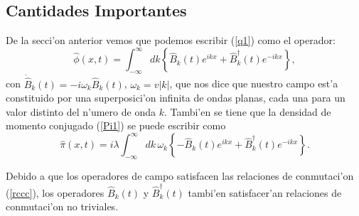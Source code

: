 \subsection{Cantidades Importantes}

De la secci'on anterior vemos que podemos escribir (\ref{q1}) como el operador:
\begin{equation}
\hat{\phi}(x,t) =\int_{-\infty}^\infty dk\left\{ \hat{B}_k(t)
e^{ikx}+\hat{B}_k^\dagger (t) e^{-ikx}\right\},
\label{qOperador1}
\end{equation}
con $\dot{\hat{B}}_k(t)=-i\omega_k\hat{B}_k(t)$, $\omega_k=v|k|$, que nos
dice que nuestro campo est'a constituido por una superposici'on
infinita de ondas planas, cada una para un valor distinto del n'umero de
onda $k$.
Tambi'en se tiene que la densidad de momento conjugado (\ref{Pi1}) se puede
escribir como
\begin{equation}
\hat{\pi}(x,t) =i\lambda\int_{-\infty}^\infty dk\,\omega_k\left\{
-\hat{B}_k(t) e^{ikx}+\hat{B}_k^\dagger (t)
e^{-ikx}\right\}.\label{piOperador1}
\end{equation}

Debido a que los operadores de campo satisfacen las relaciones de conmutaci'on
(\ref{rccc}), los operadores
$\hat{B}_k(t) $ y $\hat{B}_k^\dagger (t) $ tambi'en satisfacer'an relaciones
de conmutaci'on no triviales.


